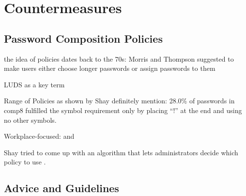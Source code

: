 \section{Countermeasures}


	\subsection{Password Composition Policies}
	
	the idea of policies dates back to the 70s: Morris and Thompson suggested to make users
	either choose longer passwords or assign passwords to them \cite{Morris1979PasswordSecurity}
	
	
	
	
	LUDS as a key term \cite{Wheeler2016zxcvbn}
	
		
	Range of Policies as shown by Shay \cite{Shay2014CanLongPasswordsBeSecureAndUsable}
	definitely mention: 28.0\% of passwords in comp8 fulfilled the symbol requirement only by placing ``!'' at the end and using no other symbols. 
	
	\cite{ZhangKennedy2016RevisitingPasswordRules}
	
	
	Workplace-focused: \cite{Inglesant2010TrueCostOfUnusablePolicies} and \cite{Zakaria2013DesigningEffectiveSecurityMessages}
	
	\cite{Florencio2014AdministratorsGuide} 
	
	\cite{Ur2015PWCreationLab}
	
	\cite{Shay2010EncounteringPasswordRequirements}
	
	\cite{Shay2016DesigningPasswordPolicies}
	
	\cite{Weir2010MetricsPolicies}
	
	\cite{Wang2015EmperorsPolicies}
	
	
	\cite{Florencio2010WhereDoPoliciesComeFrom}
	
	\cite{Horsch2016PasswordPolicyMarkup}
	
	\cite{Chiasson2015QuantifyingExpiration}
	\cite{Blocki2013OptimizingPasswordPolicies}
	\cite{Komanduri2011OfPasswordsAndPeople}
	
	
	Shay tried to come up with an algorithm that lets administrators decide which policy to use \cite{Shay2009PolicySimulation}.
	
	

	\subsection{Advice and Guidelines}
	
